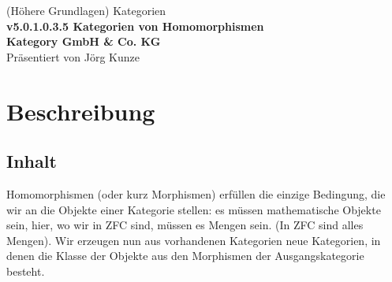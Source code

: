\documentclass[a4paper]{amsart}
\theoremstyle{definition}
\begin{document}
\begin{titlepage}
\centering
{\huge
(Höhere Grundlagen) Kategorien\\[1cm]
\textbf{v5.0.1.0.3.5 Kategorien von Homomorphismen}
}\\[1cm]

\textbf{Kategory GmbH \& Co. KG}\\
Präsentiert von Jörg Kunze

\end{titlepage}

%

\newpage

\section*{Beschreibung}

\subsection*{Inhalt}
Homomorphismen (oder kurz Morphismen) erfüllen die einzige Bedingung, die wir an die Objekte einer Kategorie stellen: es müssen mathematische Objekte sein, hier, wo wir in ZFC sind, müssen es Mengen sein. (In ZFC sind alles Mengen). Wir erzeugen nun aus vorhandenen Kategorien neue Kategorien, in denen die Klasse der Objekte aus den Morphismen der Ausgangskategorie besteht.
\end{document}
